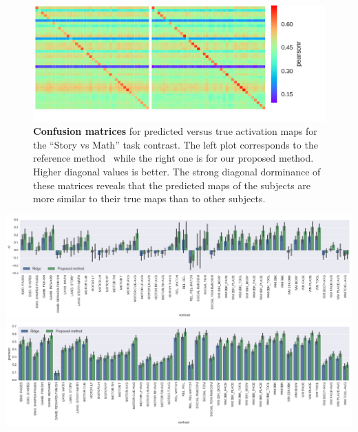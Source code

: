 \begin{figure}
  \includegraphics[width=1\linewidth]{figures/confusion_STORY-MATH.png}
  \caption{\textbf{Confusion matrices} for predicted versus true activation maps for
    the ``Story vs Math'' task contrast. The left plot corresponds to the reference
    method~\citep{tavor2016task} while the right one is for our proposed method.
      Higher diagonal values is better.
      The strong diagonal dorminance of these matrices reveals that the predicted maps of the subjects are more similar to their true maps than to other subjects.
      }
\label{fig:confusion}
\end{figure}

\begin{pagefigure}%
  \includegraphics[width=1\linewidth]{figures/all_r2.png}
  \includegraphics[width=1\linewidth]{figures/all_pearsonr.png}
  \caption{\textbf{Top:} $R^2$-score for predicting subject-specific activation maps for different task contrasts, from their resting data. These results are for the different contrasts of the HCP dataset~\citep{VanEssen20122222} are shown.
    Results for the reference method \citep{tavor2016task} are also shown.
    \textbf{Bottom:} Pearson correlation for the same prediction problem.
    }
    \label{fig:confusion_boxplots}
  \end{pagefigure}

